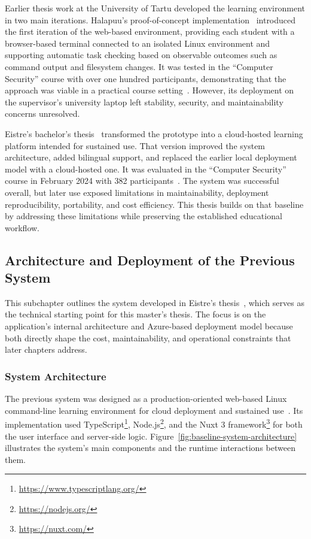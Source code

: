 Earlier thesis work at the University of Tartu developed the learning environment in two main iterations.
Halapuu's proof-of-concept implementation~\cite{halapuu_2022} introduced the first iteration of the web-based environment, providing each student with a browser-based terminal connected to an isolated Linux environment and supporting automatic task checking based on observable outcomes such as command output and filesystem changes.
It was tested in the ``Computer Security'' course with over one hundred participants, demonstrating that the approach was viable in a practical course setting~\cite{halapuu_2022}.
However, its deployment on the supervisor's university laptop left stability, security, and maintainability concerns unresolved.

Eistre's bachelor's thesis~\cite{eistre_2024} transformed the prototype into a cloud-hosted learning platform intended for sustained use.
That version improved the system architecture, added bilingual support, and replaced the earlier local deployment model with a cloud-hosted one.
It was evaluated in the ``Computer Security'' course in February 2024 with 382 participants~\cite{eistre_2024}.
The system was successful overall, but later use exposed limitations in maintainability, deployment reproducibility, portability, and cost efficiency.
This thesis builds on that baseline by addressing these limitations while preserving the established educational workflow.

\subsection{Architecture and Deployment of the Previous System} \label{subsec:architecture-and-deployment-of-the-previous-system}
This subchapter outlines the system developed in Eistre's thesis~\cite{eistre_2024}, which serves as the technical starting point for this master's thesis.
The focus is on the application's internal architecture and Azure-based deployment model because both directly shape the cost, maintainability, and operational constraints that later chapters address.

\subsubsection{System Architecture} \label{subsubsec:system-architecture}
The previous system was designed as a production-oriented web-based Linux command-line learning environment for cloud deployment and sustained use~\cite{eistre_2024}.
Its implementation used TypeScript\footnote{\url{https://www.typescriptlang.org/}}, Node.js\footnote{\url{https://nodejs.org/}}, and the Nuxt 3 framework\footnote{\url{https://nuxt.com/}} for both the user interface and server-side logic.
Figure~\ref{fig:baseline-system-architecture} illustrates the system's main components and the runtime interactions between them.

